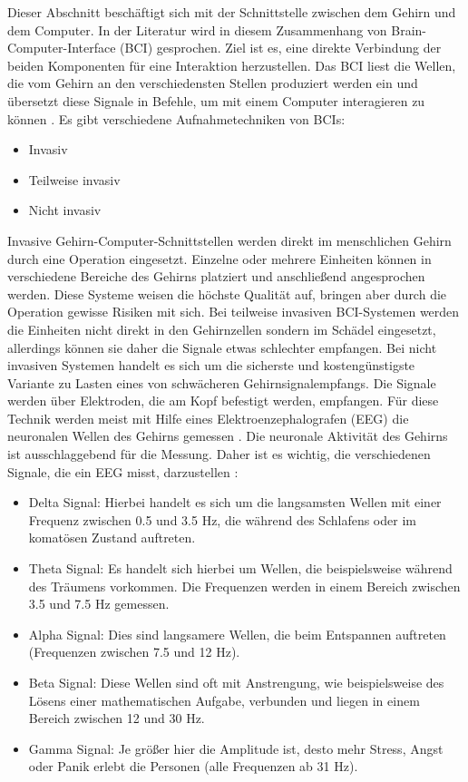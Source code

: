 Dieser Abschnitt beschäftigt sich mit der Schnittstelle zwischen dem Gehirn und dem Computer. In der Literatur wird in diesem Zusammenhang von Brain-Computer-Interface (BCI) gesprochen. Ziel ist es, eine direkte Verbindung der beiden Komponenten für eine Interaktion herzustellen. Das BCI liest die Wellen, die vom Gehirn an den verschiedensten Stellen produziert werden ein und übersetzt diese Signale in Befehle, um mit einem Computer interagieren zu können \cite{BRAIN}.
\newline \newline
Es gibt verschiedene Aufnahmetechniken von BCIs:
\begin{itemize}
      \item Invasiv
      \item Teilweise invasiv
			\item Nicht invasiv
\end{itemize}
\vspace{\baselineskip}
Invasive Gehirn-Computer-Schnittstellen werden direkt im menschlichen Gehirn durch eine Operation eingesetzt. Einzelne oder mehrere Einheiten können in verschiedene Bereiche des Gehirns platziert und anschließend angesprochen werden. Diese Systeme weisen die höchste Qualität auf, bringen aber durch die Operation gewisse Risiken mit sich.
Bei teilweise invasiven BCI-Systemen werden die Einheiten nicht direkt in den Gehirnzellen sondern im Schädel eingesetzt, allerdings können sie daher die Signale etwas schlechter empfangen. Bei nicht invasiven Systemen handelt es sich um die sicherste und kostengünstigste Variante zu Lasten eines von schwächeren Gehirnsignalempfangs. Die Signale werden über Elektroden, die am Kopf befestigt werden, empfangen. Für diese Technik werden meist mit Hilfe eines Elektroenzephalografen (EEG) die neuronalen Wellen des Gehirns gemessen \cite{BRAIN}.
\newline \newline 
Die neuronale Aktivität des Gehirns ist ausschlaggebend für die Messung. Daher ist es wichtig, die verschiedenen Signale, die ein EEG misst, darzustellen \cite{BRAIN}:
\begin{itemize}
      \item Delta Signal: Hierbei handelt es sich um die langsamsten Wellen mit einer Frequenz zwischen 0.5 und 3.5 Hz, die während des Schlafens oder im komatösen Zustand auftreten.
      \item Theta Signal: Es handelt sich hierbei um Wellen, die beispielsweise während des Träumens vorkommen. Die Frequenzen werden in einem Bereich zwischen 3.5 und 7.5 Hz gemessen.
			\item Alpha Signal: Dies sind langsamere Wellen, die beim Entspannen auftreten (Frequenzen zwischen 7.5 und 12 Hz).
			\item Beta Signal: Diese Wellen sind oft mit Anstrengung, wie beispielsweise des Lösens einer mathematischen Aufgabe, verbunden und liegen in einem Bereich zwischen 12 und 30 Hz.
      \item Gamma Signal: Je größer hier die Amplitude ist, desto mehr Stress, Angst oder Panik erlebt die Personen (alle Frequenzen ab 31 Hz).
\end{itemize}
